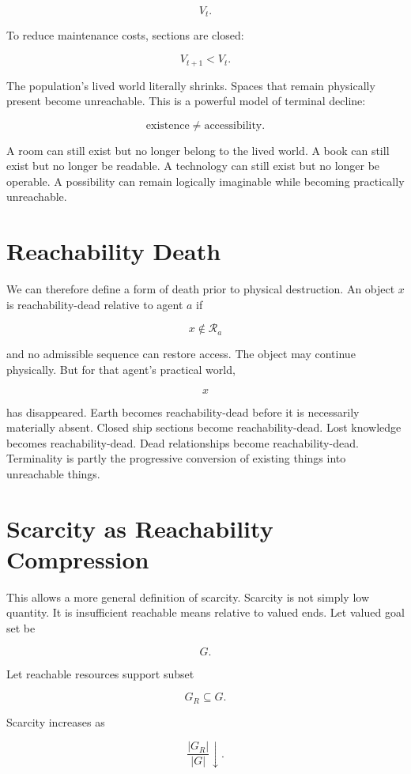 \documentclass[11pt,oneside]{book}
\theoremstyle{definition}
\theoremstyle{remark}
\newcommand{\R}{\mathcal{R}}
\begin{document}
\[
V_t.
\]

To reduce maintenance costs, sections are closed:

\[
V_{t+1}<V_t.
\]

The population's lived world literally shrinks. Spaces that remain physically present become
unreachable. This is a powerful model of terminal decline:

\[
\text{existence} \neq \text{accessibility}.
\]

A room can still exist but no longer belong to the lived world. A book can still exist but no longer
be readable. A technology can still exist but no longer be operable. A possibility can remain
logically imaginable while becoming practically unreachable.

\section{Reachability Death}

We can therefore define a form of death prior to physical destruction. An object \(x\) is
reachability-dead relative to agent \(a\) if

\[
x\notin\R_a
\]

and no admissible sequence can restore access. The object may continue physically. But for that
agent's practical world,

\[
x
\]

has disappeared. Earth becomes reachability-dead before it is necessarily materially absent. Closed
ship sections become reachability-dead. Lost knowledge becomes reachability-dead. Dead relationships
become reachability-dead. Terminality is partly the progressive conversion of existing things into
unreachable things.

\section{Scarcity as Reachability Compression}

This allows a more general definition of scarcity. Scarcity is not simply low quantity. It is
insufficient reachable means relative to valued ends. Let valued goal set be

\[
G.
\]

Let reachable resources support subset

\[
G_R\subseteq G.
\]

Scarcity increases as

\[
\frac{|G_R|}{|G|} \downarrow.
\]
\end{document}
